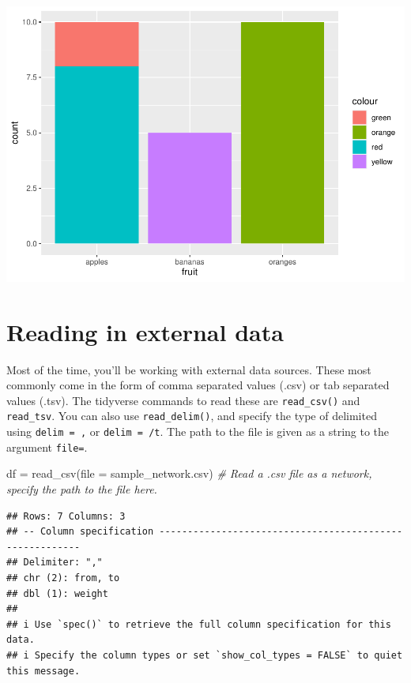 \documentclass[
]{book}
\newenvironment{Shaded}{\begin{snugshade}}{\end{snugshade}}
\newcommand{\AttributeTok}[1]{\textcolor[rgb]{0.77,0.63,0.00}{#1}}
\newcommand{\CommentTok}[1]{\textcolor[rgb]{0.56,0.35,0.01}{\textit{#1}}}
\newcommand{\FunctionTok}[1]{\textcolor[rgb]{0.00,0.00,0.00}{#1}}
\newcommand{\NormalTok}[1]{#1}
\newcommand{\OtherTok}[1]{\textcolor[rgb]{0.56,0.35,0.01}{#1}}
\newcommand{\StringTok}[1]{\textcolor[rgb]{0.31,0.60,0.02}{#1}}
\begin{document}
\includegraphics{_main_files/figure-latex/unnamed-chunk-27-1.pdf}

\hypertarget{reading-in-external-data}{%
\section{Reading in external data}\label{reading-in-external-data}}

Most of the time, you'll be working with external data sources. These most commonly come in the form of comma separated values (.csv) or tab separated values (.tsv). The tidyverse commands to read these are \texttt{read\_csv()} and \texttt{read\_tsv}. You can also use \texttt{read\_delim()}, and specify the type of delimited using \texttt{delim\ =\ \textquotesingle{},\textquotesingle{}} or \texttt{delim\ =\ \textquotesingle{}/t}. The path to the file is given as a string to the argument \texttt{file=}.

\begin{Shaded}
\begin{Highlighting}[]
\NormalTok{df }\OtherTok{=} \FunctionTok{read\_csv}\NormalTok{(}\AttributeTok{file =} \StringTok{\textquotesingle{}sample\_network.csv\textquotesingle{}}\NormalTok{) }\CommentTok{\# Read a .csv file as a network, specify the path to the file here.}
\end{Highlighting}
\end{Shaded}

\begin{verbatim}
## Rows: 7 Columns: 3
## -- Column specification --------------------------------------------------------
## Delimiter: ","
## chr (2): from, to
## dbl (1): weight
## 
## i Use `spec()` to retrieve the full column specification for this data.
## i Specify the column types or set `show_col_types = FALSE` to quiet this message.
\end{verbatim}
\end{document}
